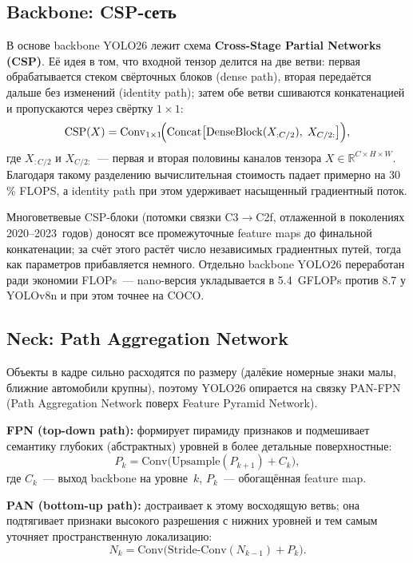 \documentclass[10pt,a4paper]{report}
\numberwithin{equation}{chapter}
\numberwithin{figure}{chapter}
\numberwithin{table}{chapter}
\begin{document}
\subsection{Backbone: CSP-сеть}
\label{subsec:backbone}

В основе backbone YOLO26 лежит схема \textbf{Cross-Stage Partial
Networks (CSP)}. Её идея в том, что входной тензор делится на две ветви:
первая обрабатывается стеком свёрточных блоков (dense path), вторая
передаётся дальше без изменений (identity path); затем обе ветви
сшиваются конкатенацией и пропускаются через свёртку $1\times1$:
\begin{equation}
  \mathrm{CSP}(X) =
    \mathrm{Conv}_{1\times1}\!\Bigl(
      \mathrm{Concat}\bigl[
        \mathrm{DenseBlock}(X_{:C/2}),\;
        X_{C/2:}
      \bigr]
    \Bigr),
\end{equation}
где $X_{:C/2}$ и $X_{C/2:}$~--- первая и вторая половины каналов
тензора $X \in \mathbb{R}^{C \times H \times W}$.
Благодаря такому разделению вычислительная стоимость падает примерно на
30\,\% FLOPS, а identity path при этом удерживает насыщенный градиентный
поток.

Многоветвевые CSP-блоки (потомки связки C3$\to$C2f, отлаженной в
поколениях 2020--2023~годов) доносят все промежуточные feature maps до
финальной конкатенации; за счёт этого растёт число независимых
градиентных путей, тогда как параметров прибавляется немного. Отдельно
backbone YOLO26 переработан ради экономии FLOPs~--- nano-версия
укладывается в 5.4~GFLOPs против 8.7 у YOLOv8n и при этом точнее на COCO.

\subsection{Neck: Path Aggregation Network}
\label{subsec:neck}

Объекты в кадре сильно расходятся по размеру (далёкие номерные знаки
малы, ближние автомобили крупны), поэтому YOLO26 опирается на связку
PAN-FPN (Path Aggregation Network поверх Feature Pyramid Network).

\textbf{FPN (top-down path):} формирует пирамиду признаков и подмешивает
семантику глубоких (абстрактных) уровней в более детальные
поверхностные:
\begin{equation}
  P_k = \mathrm{Conv}\bigl(\mathrm{Upsample}(P_{k+1}) + C_k\bigr),
\end{equation}
где $C_k$~--- выход backbone на уровне~$k$, $P_k$~--- обогащённая
feature map.

\textbf{PAN (bottom-up path):} достраивает к этому восходящую ветвь;
она подтягивает признаки высокого разрешения с нижних уровней и тем
самым уточняет пространственную локализацию:
\begin{equation}
  N_k = \mathrm{Conv}\bigl(\mathrm{Stride\text{-}Conv}(N_{k-1}) + P_k\bigr).
\end{equation}
\end{document}
